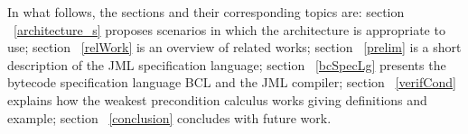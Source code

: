 In what follows, the sections and their corresponding topics are: 
section ~\ref{architecture_s} proposes scenarios in which the architecture is appropriate to use; section ~\ref{relWork} is an overview of related works; 
section  ~\ref{prelim} is a short description of the JML specification language; section ~\ref{bcSpecLg} presents the bytecode specification language BCL and the JML compiler; section ~\ref{verifCond} explains how the weakest precondition calculus works giving definitions and example; section ~\ref{conclusion} concludes with future work.  















